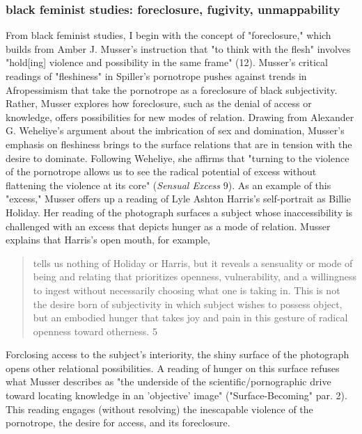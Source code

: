 \documentclass[11pt]{article}
\begin{document}
\subsubsection{black feminist studies: foreclosure, fugivity, unmappability}
\label{sec:org2019f71}
From black feminist studies, I begin with the concept of
"foreclosure," which builds from Amber J. Musser's instruction that
"to think with the flesh" involves "hold[ing] violence and possibility
in the same frame" (12). Musser's critical readings of "fleshiness" in
Spiller's pornotrope pushes against trends in Afropessimism that take
the pornotrope as a foreclosure of black subjectivity. Rather, Musser
explores how foreclosure, such as the denial of access or knowledge,
offers possibilities for new modes of relation. Drawing from Alexander
G. Weheliye's argument about the imbrication of sex and domination,
Musser's emphasis on fleshiness brings to the surface relations that
are in tension with the desire to dominate. Following Weheliye, she
affirms that "turning to the violence of the pornotrope allows us to
see the radical potential of excess without flattening the violence at
its core" (\emph{Sensual Excess} 9). As an example of this "excess," Musser
offers up a reading of Lyle Ashton Harris's self-portrait as Billie
Holiday. Her reading of the photograph surfaces a subject whose
inaccessibility is challenged with an excess that depicts hunger as a
mode of relation. Musser explains that Harris's open mouth, for
example,
\begin{quote}
tells us nothing of Holiday or Harris, but it reveals a sensuality or
mode of being and relating that prioritizes openness, vulnerability,
and a willingness to ingest without necessarily choosing what one is
taking in. This is not the desire born of subjectivity in which
subject wishes to possess object, but an embodied hunger that takes
joy and pain in this gesture of radical openness toward otherness. 5
\end{quote}
Forclosing access to the subject's interiority, the shiny surface of
the photograph opens other relational possibilities. A reading of
hunger on this surface refuses what Musser describes as "the underside
of the scientific/pornographic drive toward locating knowledge in an
'objective' image" ("Surface-Becoming" par. 2). This reading engages
(without resolving) the inescapable violence of the pornotrope, the
desire for access, and its foreclosure.
\end{document}
